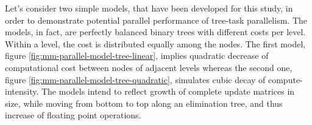 Let's consider two simple models, that have been developed for this study, in order to demonstrate potential parallel performance of tree-task parallelism. The models, in fact, are perfectly balanced binary trees with different costs per level. Within a level, the cost is distributed equally among the nodes. The first model, figure \ref{fig:mm-parallel-model-tree-linear}, implies 
quadratic decrease of computational cost between nodes of adjacent levels whereas the second one, figure \ref{fig:mm-parallel-model-tree-quadratic}, simulates cubic decay of compute-intensity. The models intend to reflect growth of complete update matrices in size, while moving from bottom to top along an elimination tree, and thus increase of floating point operations.\\













